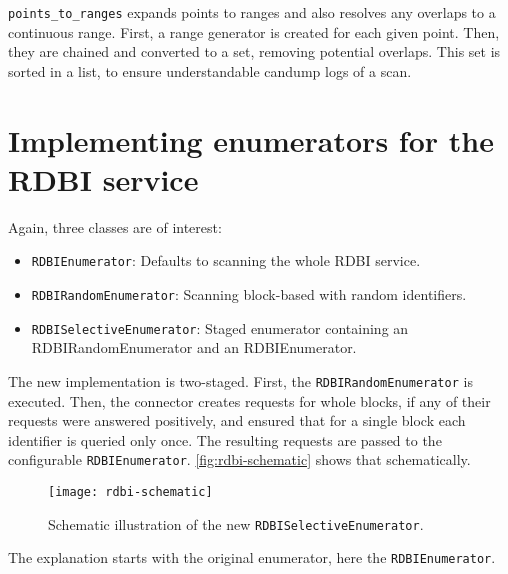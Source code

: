 \texttt{points_to_ranges} expands points to ranges and also resolves any overlaps to a continuous range.
First, a range generator is created for each given point. Then, they are chained and converted to a set, removing potential overlaps. This set is sorted in a list, to ensure understandable candump logs of a scan.

\section{Implementing enumerators for the RDBI service}

Again, three classes are of interest:

\begin{itemize}
    \item \texttt{RDBIEnumerator}: Defaults to scanning the whole RDBI service.
    \item \texttt{RDBIRandomEnumerator}: Scanning block-based with random identifiers.
    \item \texttt{RDBISelectiveEnumerator}: Staged enumerator containing an RDBIRandomEnumerator and an RDBIEnumerator.
\end{itemize}

The new implementation is two-staged. First, the \texttt{RDBIRandomEnumerator} is executed. Then, the connector creates requests for whole blocks, if any of their requests were answered positively, and ensured that for a single block each identifier is queried only once. The resulting requests are passed to the configurable \texttt{RDBIEnumerator}. \autoref{fig:rdbi-schematic} shows that schematically.

\begin{figure}[htb]
    \centering
    \texttt{[image: rdbi-schematic]}
    \caption{Schematic illustration of the new \texttt{RDBISelectiveEnumerator}.}
    \label{fig:rdbi-schematic}
\end{figure}

The explanation starts with the original enumerator, here the \texttt{RDBIEnumerator}.



